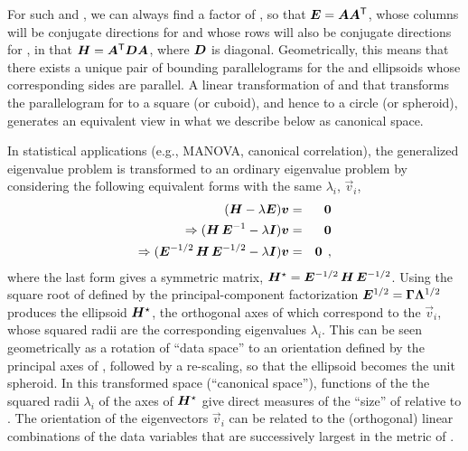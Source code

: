 For such  and , we can always find a factor  of , so that
$\bm{E} = \bm{A} \bm{A}^\mathsf{T}$, whose columns will be conjugate directions for 
and whose rows will also be conjugate directions for , in that $\bm{H} = \bm{A}^\mathsf{T} \bm{D} \bm{A}$,
where $\bm{D}$ is diagonal.  Geometrically, this means that there exists a unique pair of
bounding parallelograms for the  and  ellipsoids whose
corresponding sides are parallel. A linear transformation of  and 
that transforms the parallelogram
for  to a square (or cuboid), and hence  to a circle (or spheroid), generates an
equivalent view in what we describe below as canonical space.


In statistical applications (e.g., MANOVA, canonical correlation), the generalized
eigenvalue problem is transformed to an ordinary eigenvalue problem by considering
the following equivalent forms with the same $\lambda_i$, $\vec{v}_i$,
\begin{eqnarray*}
(\bm{H} - \lambda \bm{E}) \bm{v} & = & \bm{0} \\
\Rightarrow (\bm{H} \, \bm{\bm{E}}^{-1} - \lambda \bm{I}) \bm{v} & = & \bm{0} \\
\Rightarrow (\bm{\bm{E}}^{-1/2} \, \bm{H} \, \bm{\bm{E}}^{-1/2} - \lambda \bm{I}) \bm{v} & = & \bm{0} \:\: ,
\end{eqnarray*}
where the last form gives a symmetric matrix, $\bm{H}^\star = \bm{E}^{-1/2} \, \bm{H} \, \bm{E}^{-1/2}$.
Using the square root of  defined by the
principal-component factorization $\bm{E}^{1/2} = \bm{\Gamma} \bm{\bm{\Lambda}}^{1/2}$ produces
the ellipsoid  $\bm{H}^\star$, the
orthogonal axes of which correspond to the $\vec{v}_i$, whose squared radii are the corresponding %
eigenvalues $\lambda_i$.  This can be seen geometrically as a rotation of ``data space''
to an orientation defined by the principal axes of , followed by a re-scaling, so
that the  ellipsoid becomes the unit spheroid.  In this transformed space
(``canonical space''), functions of the
the squared radii $\lambda_i$ of the axes of $\bm{H}^\star$ give direct measures of %
the ``size'' of  relative to . The orientation of the eigenvectors
$\vec{v}_i$ can be related to the (orthogonal) linear combinations of the
data variables that are successively largest in the metric of .


